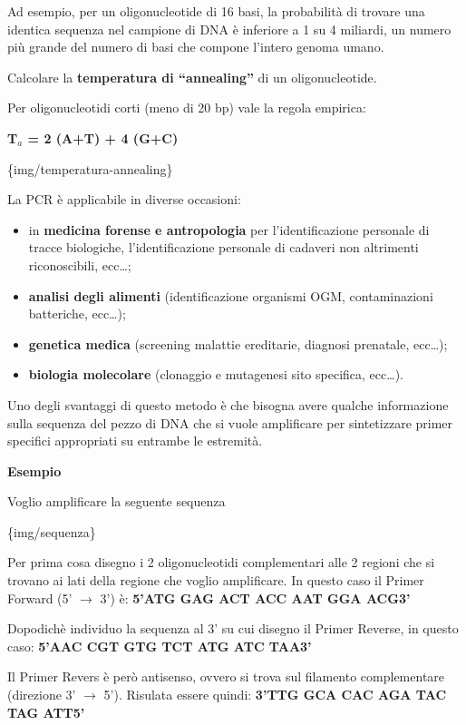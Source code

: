 \documentclass[]{article}
\begin{document}
Ad esempio, per un oligonucleotide di 16 basi, la probabilità di trovare
una identica sequenza nel campione di DNA è inferiore a 1 su 4 miliardi,
un numero più grande del numero di basi che compone l'intero genoma
umano.

Calcolare la \textbf{temperatura di ``annealing''} di un
oligonucleotide.

Per oligonucleotidi corti (meno di 20 bp) vale la regola empirica:

\textbf{T\(_a\) = 2 (A+T) + 4 (G+C)}

\{img/temperatura-annealing\}

La PCR è applicabile in diverse occasioni:

\begin{itemize}
\itemsep1pt\parskip0pt
\item
  in \textbf{medicina forense e antropologia} per l'identificazione
  personale di tracce biologiche, l'identificazione personale di
  cadaveri non altrimenti riconoscibili, ecc\ldots{};
\item
  \textbf{analisi degli alimenti} (identificazione organismi OGM,
  contaminazioni batteriche, ecc\ldots{});
\item
  \textbf{genetica medica} (screening malattie ereditarie, diagnosi
  prenatale, ecc\ldots{});
\item
  \textbf{biologia molecolare} (clonaggio e mutagenesi sito specifica,
  ecc\ldots{}).
\end{itemize}

Uno degli svantaggi di questo metodo è che bisogna avere qualche
informazione sulla sequenza del pezzo di DNA che si vuole amplificare
per sintetizzare primer specifici appropriati su entrambe le estremità.

\textbf{Esempio}

Voglio amplificare la seguente sequenza

\{img/sequenza\}

Per prima cosa disegno i 2 oligonucleotidi complementari alle 2 regioni
che si trovano ai lati della regione che voglio amplificare. In questo
caso il Primer Forward (5' \(\rightarrow\) 3') è: \textbf{5'ATG GAG ACT
ACC AAT GGA ACG3'}

Dopodichè individuo la sequenza al 3' su cui disegno il Primer Reverse,
in questo caso: \textbf{5'AAC CGT GTG TCT ATG ATC TAA3'}

Il Primer Revers è però antisenso, ovvero si trova sul filamento
complementare (direzione 3' \(\rightarrow\) 5'). Risulata essere quindi:
\textbf{3'TTG GCA CAC AGA TAC TAG ATT5'}
\end{document}
